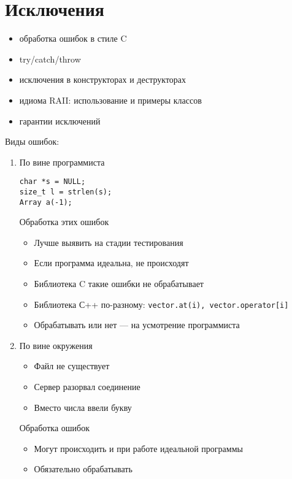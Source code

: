 \section{Исключения}
\begin{itemize}[noitemsep]
    \item обработка ошибок в стиле C
    \item try/catch/throw
    \item исключения в конструкторах и деструкторах
    \item идиома RAII: использование и примеры классов
    \item гарантии исключений
\end{itemize}
Виды ошибок:
\begin{enumerate}[noitemsep]
    \item По вине программиста
	\begin{verbatim}
char *s = NULL;
size_t l = strlen(s);
Array a(-1);
	\end{verbatim}
	Обработка этих ошибок
	\begin{itemize}[noitemsep]
	    \item Лучше выявить на стадии тестирования
	    \item Если программа идеальна, не происходят
	    \item Библиотека C такие ошибки не обрабатывает
	    \item Библиотека С++ по-разному: \texttt{vector.at(i), vector.operator[i]}
	    \item Обрабатывать или нет --- на усмотрение программиста
	\end{itemize}
    \item По вине окружения
	\begin{itemize}[noitemsep]
	    \item Файл не существует
	    \item Сервер разорвал соединение
	    \item Вместо числа ввели букву
	\end{itemize}
	 Обработка ошибок
	 \begin{itemize}[noitemsep]
	     \item Могут происходить и при работе идеальной программы
	     \item Обязательно обрабатывать
	 \end{itemize}
\end{enumerate} 
